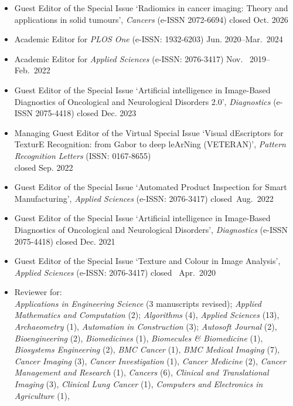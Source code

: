 \documentclass[11pt]{article}
\begin{document}
\begin{itemize}
	\item Guest Editor of the Special Issue `Radiomics in cancer imaging: Theory and applications in solid tumours', \emph{Cancers} (e-ISSN 2072-6694) \hfill closed Oct. 2026
	\item Academic Editor for \emph{PLOS One} (e-ISSN: 1932-6203) \hfill Jun. 2020--Mar.~2024
	\item Academic Editor for \emph{Applied Sciences} (e-ISSN: 2076-3417) \hfill Nov.~ 2019--Feb.~2022
	\item Guest Editor of the Special Issue `Artificial intelligence in Image-Based Diagnostics of Oncological and Neurological Disorders 2.0', \emph{Diagnostics} (e-ISSN 2075-4418) \hfill closed Dec. 2023
		\item Managing Guest Editor of the Virtual Special Issue `Visual dEscriptors for TexturE Recognition: from Gabor to deep leArNing (VETERAN)', \emph{Pattern Recognition Letters} (ISSN: 0167-8655) \\ \mbox{} \hfill closed Sep. 2022
	\item Guest Editor of the Special Issue `Automated Product Inspection for Smart Manufacturing', \emph{Applied Sciences} (e-ISSN: 2076-3417) \hfill closed~Aug.~2022
	\item Guest Editor of the Special Issue `Artificial intelligence in Image-Based Diagnostics of Oncological and Neurological Disorders', \emph{Diagnostics} (e-ISSN 2075-4418) \hfill closed Dec. 2021
	\item Guest Editor of the Special Issue `Texture and Colour in Image Analysis', \emph{Applied Sciences} (e-ISSN: 2076-3417) \hfill closed~ Apr.~2020
	\item Reviewer for: \\
		\emph{Applications in Engineering Science} (3 manuscripts revised);
    \emph{Applied Mathematics and Computation} (2);
    \emph{Algorithms} (4),
    \emph{Applied Sciences} (13),
    \emph{Archaeometry} (1),
    \emph{Automation in Construction} (3);
    \emph{Autosoft Journal} (2),
		\emph{Bioengineering} (2),
		\emph{Biomedicines} (1),
		\emph{Biomecules \& Biomedicine} (1), 
		\emph{Biosystems Engineering} (2),
		\emph{BMC Cancer} (1),
    \emph{BMC Medical Imaging} (7),
    \emph{Cancer Imaging} (3),
    \emph{Cancer Investigation} (1),
    \emph{Cancer Medicine} (2),
    \emph{Cancer Management and Research} (1),
		\emph{Cancers} (6),
		\emph{Clinical and Translational Imaging} (3),
		\emph{Clinical Lung Cancer} (1),
    \emph{Computers and Electronics in Agriculture} (1),

\end{itemize}
\end{document}
